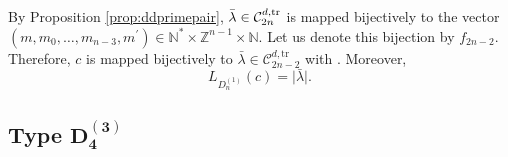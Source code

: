 \documentclass[pdftex]{sigma}
\numberwithin{equation}{section}
\newcommand{\cC}{\mathcal{C}}
\newcommand{\Z}{\mathbb{Z}}
\newcommand{\N}{\mathbb{N}}
\renewcommand{\OE}{\mathrm{O}}
\renewcommand{\oe}{\mathrm{o}^{\text{even}}}
\begin{document}
%
%
%

By Proposition \ref{prop:ddprimepair}, $\bar{\lambda}\in\cC_{2n}^{d,\mathrm{%
		tr}}$ is mapped bijectively to the vector $(m,m_0,\dots,m_{n-3},m^{\prime
})\in\N^*\times \Z^{n-1}\times \N$. Let us denote this bijection by $%
f_{2n-2} $. Therefore, $c$ is mapped bijectively to $\bar{\lambda}\in\cC%
_{2n-2}^{d,\mathrm{tr}}$ with . Moreover,
\begin{equation*}
L_{D_{n}^{(1)}}(c)=\bigl\lvert \bar{\lambda}\bigr\rvert.
\end{equation*}


\subsection[Type D\_4\^{}(3)]{Type $\boldsymbol{D_{4}^{(3)}}$}
\end{document}
